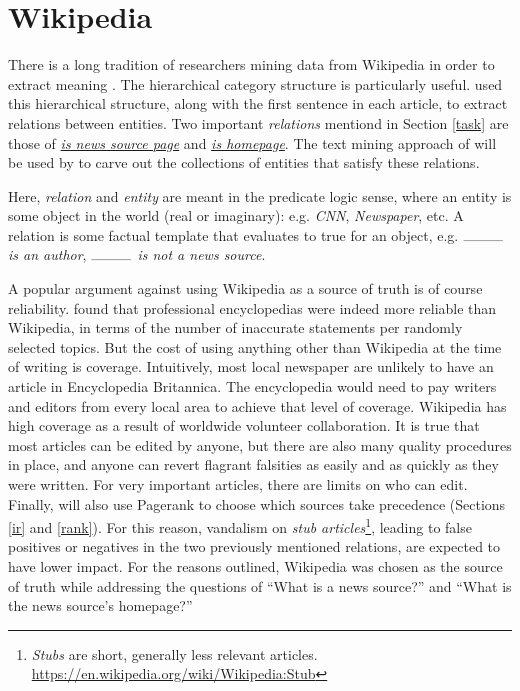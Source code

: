 \clearpage
\section{Wikipedia}

There is a long tradition of researchers mining data from Wikipedia in order to
extract meaning \cite{nguyen2007, nakayama2007, lehmann2015}.  The
hierarchical category structure is particularly useful.
 used this hierarchical structure, along with the
first sentence in each article, to extract relations between entities.
Two important {\it relations} mentiond in Section \ref{task} are those
of \underline{{\it is news source page}} and \underline{{\it is homepage}}.  The text
mining approach of  will be used by \nr{} to carve out
the collections of entities that satisfy these relations.

Here, {\it relation} and {\it entity} are meant in the predicate
logic sense, where an entity is some object in the world
(real or imaginary): e.g. {\it CNN}, {\it Newspaper}, etc.  A relation is
some factual template that evaluates to true for an object, e.g.
{\it $\rule{1cm}{0.09mm}$ is an author},
{\it $\rule{1cm}{0.09mm}$ is not a news source}.

A popular argument against using Wikipedia as a source of truth
is of course reliability.  found that professional
encyclopedias were indeed more reliable than Wikipedia, in terms
of the number of inaccurate statements per randomly selected topics.  But
the cost of using anything other than Wikipedia at the time of writing
is coverage.  Intuitively, most local newspaper are unlikely to have
an article in Encyclopedia Britannica. The encyclopedia would
need to pay writers and editors from every local area to achieve
that level of coverage.  Wikipedia has high coverage as a result
of worldwide volunteer collaboration.  It is true that most articles
can be edited by anyone, but there are also many quality procedures
in place, and anyone can revert flagrant falsities as easily and as
quickly as they were written.  For very important articles, there
are limits on who can edit.  Finally, \nr{} will also use Pagerank
to choose which sources take precedence (Sections \ref{ir} and \ref{rank}).
For this reason, vandalism on {\it stub articles}\footnote{
{\it Stubs} are short, generally less relevant articles.
\url{https://en.wikipedia.org/wiki/Wikipedia:Stub}
},
leading to false positives or negatives in the two previously mentioned
relations, are expected to have lower impact.  For the reasons
outlined, Wikipedia was chosen as the source of truth while
addressing the questions of
``What is a news source?'' and ``What is the news source's homepage?''